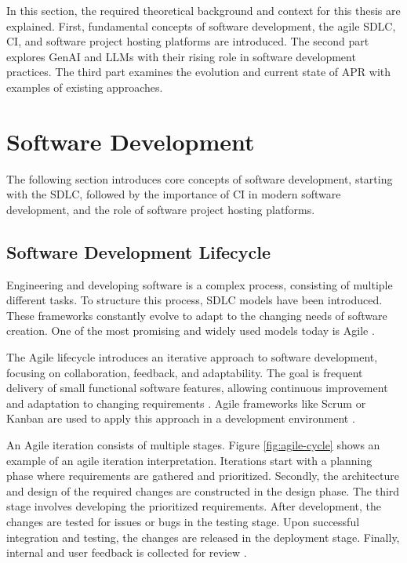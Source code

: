 In this section, the required theoretical background and context for this thesis are explained. First, fundamental concepts of software development, the agile \acf{SDLC}, \acf{CI}, and software project hosting platforms are introduced. The second part explores \ac{GenAI} and \acp{LLM} with their rising role in software development practices. The third part examines the evolution and current state of \acf{APR} with examples of existing approaches.

\section{Software Development}

The following section introduces core concepts of software development, starting with the \ac{SDLC}, followed by the importance of \ac{CI} in modern software development, and the role of software project hosting platforms.

\subsection{Software Development Lifecycle}

Engineering and developing software is a complex process, consisting of multiple different tasks. To structure this process, \ac{SDLC} models have been introduced. These frameworks constantly evolve to adapt to the changing needs of software creation. One of the most promising and widely used models today is Agile \cite{rupareliaSoftwareDevelopmentLifecycle2010, abrahamssonAgileSoftwareDevelopment2017}.

The Agile lifecycle introduces an iterative approach to software development, focusing on collaboration, feedback, and adaptability. The goal is frequent delivery of small functional software features, allowing continuous improvement and adaptation to changing requirements \cite{rupareliaSoftwareDevelopmentLifecycle2010, abrahamssonAgileSoftwareDevelopment2017}. Agile frameworks like Scrum or Kanban are used to apply this approach in a development environment \cite{zayatFrameworkStudyAgile2020}.

An Agile iteration consists of multiple stages. Figure \ref{fig:agile-cycle} shows an example of an agile iteration interpretation. Iterations start with a planning phase where requirements are gathered and prioritized. Secondly, the architecture and design of the required changes are constructed in the design phase. The third stage involves developing the prioritized requirements. After development, the changes are tested for issues or bugs in the testing stage. Upon successful integration and testing, the changes are released in the deployment stage. Finally, internal and user feedback is collected for review \cite{huoSoftwareQualityAgile2004}.

